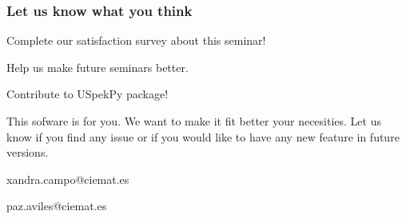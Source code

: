 \documentclass{beamer}
\newcommand{\highlight}[1]{{\color{blue} #1}}
\begin{document}
	\begin{frame}
		\frametitle{Let us know what you think}
		\centering
		\highlight{Complete our satisfaction survey about this seminar!}
		
		Help us make future seminars better.
		
		\bigskip
		
		\href{https://forms.gle/zymzqsLidy5uxKQV6}{}
		
		\bigskip
		
		\highlight{Contribute to USpekPy package!}
		
		This sofware is for you. We want to make it fit better your necesities. Let us know if you find any issue or if you would like to have any new feature in future versions.
		
		\bigskip
		
		\href{https://github.com/lmri-met/uspekpy/issues}{}
		
		xandra.campo@ciemat.es
		
		paz.aviles@ciemat.es
	\end{frame}
	
\end{document}
